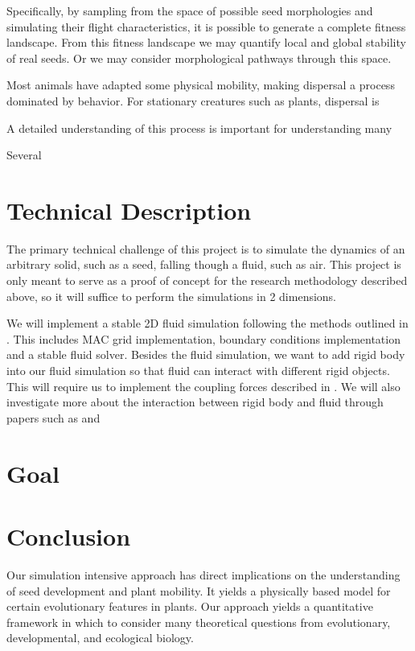 \documentclass[annual]{acmsiggraph}
\begin{document}
 Specifically, by sampling from the space of possible seed morphologies and simulating their flight characteristics, it is possible to generate a complete fitness landscape.  From this fitness landscape we may quantify local and global stability of real seeds.  Or we may consider morphological pathways through this space.  
 
 

Most animals have adapted some physical mobility, making dispersal a process dominated by behavior.  For stationary creatures such as plants, dispersal is  


A detailed understanding of this process is important for understanding many 



\cite{wang2012}
\cite{levin1989}

Several 



\section{Technical Description}
The primary technical challenge of this project is to simulate the dynamics of an arbitrary solid, such as a seed, falling though a fluid, such as air.  This project is only meant to serve as a proof of concept for the research methodology described above, so it will suffice to perform the simulations in 2 dimensions.   

We will implement a stable 2D fluid simulation following the methods outlined in \cite{bridson2006}. This includes MAC grid implementation, boundary conditions implementation and a stable fluid solver. Besides the fluid simulation, we want to add rigid body into our fluid simulation so that fluid can interact with different rigid objects. This will require us to implement the coupling forces described in \cite{carlson2004}. We will also investigate more about the interaction between rigid body and fluid through papers such as \cite{guendelman2005} and \cite{baxter2004}

\section{Goal}

\section{Conclusion}

Our simulation intensive approach has direct implications on the understanding of seed development and plant mobility.  It yields a physically based model for certain evolutionary features in plants.   Our approach yields a quantitative framework in which to consider many theoretical questions from evolutionary, developmental, and ecological biology.  




\end{document}
